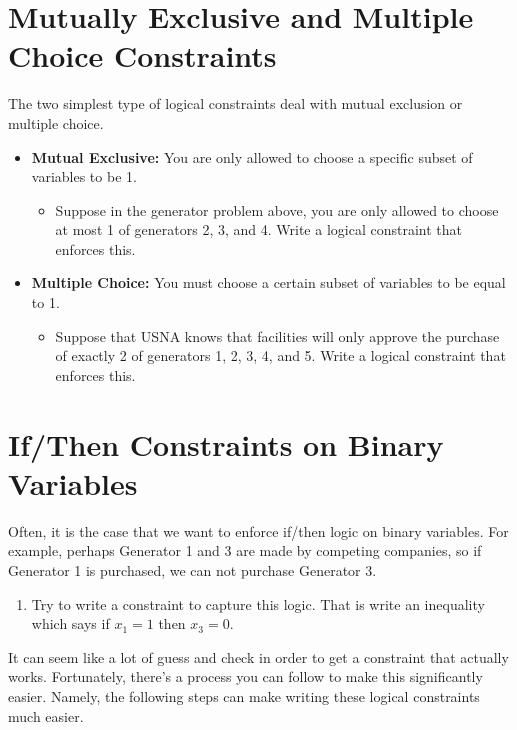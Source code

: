 \documentclass[11pt]{article}
\theoremstyle{definition}
\begin{document}
\section{Mutually Exclusive and Multiple Choice Constraints}

The two simplest type of logical constraints deal with mutual exclusion or multiple choice.
\begin{itemize}
\item \textbf{Mutual Exclusive:} You are only allowed to choose a specific subset of variables to be 1. 
	\begin{itemize}
	\item Suppose in the generator problem above, you are only allowed to choose at most 1 of generators 2, 3, and 4. Write a logical constraint that enforces this. \vspace{2in}
	\end{itemize}
\item \textbf{Multiple Choice:} You must choose a certain subset of variables to be equal to 1.
	\begin{itemize}
	\item Suppose that USNA knows that facilities will only approve the purchase of exactly 2 of generators 1, 2, 3, 4, and 5. Write a logical constraint that enforces this.
	\end{itemize}
\end{itemize}

\newpage


\section{If/Then Constraints on Binary Variables}

Often, it is the case that we want to enforce if/then logic on binary variables. For example, perhaps Generator 1 and 3 are made by competing companies, so if Generator 1 is purchased, we can not purchase Generator 3.

\begin{enumerate}[resume]
\item Try to write a constraint to capture this logic. That is write an inequality which says if $x_1 = 1$ then $x_3 = 0$. \vspace{2in}
\end{enumerate}

It can seem like a lot of guess and check in order to get a constraint that actually works. Fortunately, there's a process you can follow to make this significantly easier. Namely, the following steps can make writing these logical constraints much easier.
\end{document}
